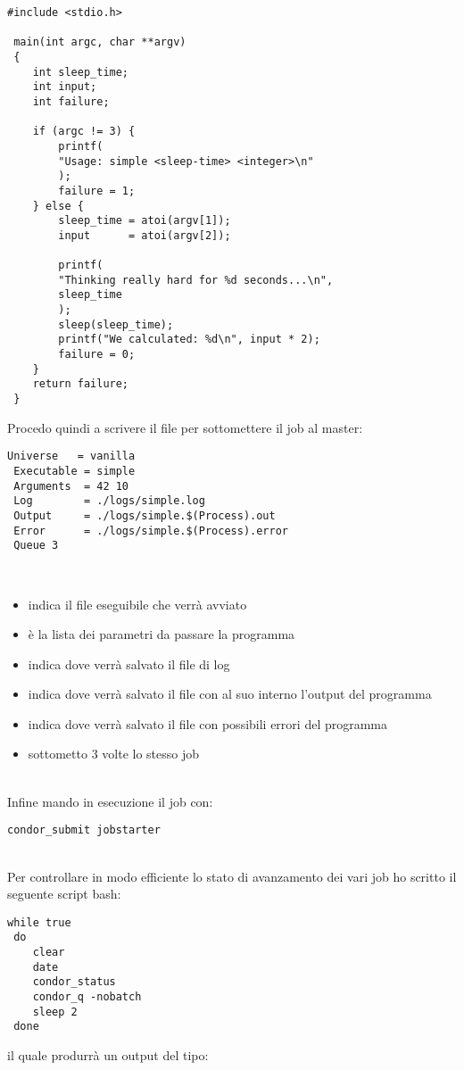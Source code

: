 \begin{lstlisting}[style=c]
 #include <stdio.h>
 
 main(int argc, char **argv)
 {
	int sleep_time;
	int input;
	int failure;
	
	if (argc != 3) {
		printf(
		"Usage: simple <sleep-time> <integer>\n"
		);
		failure = 1;
	} else {
		sleep_time = atoi(argv[1]);
		input      = atoi(argv[2]);
		
		printf(
		"Thinking really hard for %d seconds...\n",
		sleep_time
		);
		sleep(sleep_time);
		printf("We calculated: %d\n", input * 2);
		failure = 0;
	}
	return failure;
 }
\end{lstlisting}
\pagebreak
Procedo quindi a scrivere il file  per sottomettere il job al master: 

\begin{lstlisting}[style=cmd]
 Universe   = vanilla
 Executable = simple
 Arguments  = 42 10
 Log        = ./logs/simple.log
 Output     = ./logs/simple.$(Process).out
 Error      = ./logs/simple.$(Process).error
 Queue 3
\end{lstlisting}
\ \\
\begin{itemize}
	\item {} indica il file eseguibile che verr\`{a} avviato
	\item {} \`{e} la lista dei parametri da passare la programma
	\item {} indica dove verr\`{a} salvato il file di log
	\item {} indica dove verr\`{a} salvato il file con al suo interno l'output del programma
	\item {} indica dove verr\`{a} salvato il file con possibili errori del programma
	\item {} sottometto 3 volte lo stesso job
\end{itemize}
\ \\
Infine mando in esecuzione il job con: 

\begin{lstlisting}[style=cmd]
 condor_submit jobstarter
\end{lstlisting}
\ \\
Per controllare in modo efficiente lo stato di avanzamento dei vari job ho scritto il seguente script bash:

\begin{lstlisting}[style=bash]
 while true
 do
    clear
    date
    condor_status
    condor_q -nobatch
    sleep 2
 done
\end{lstlisting}
\pagebreak
il quale produrr\`{a} un output del tipo:

